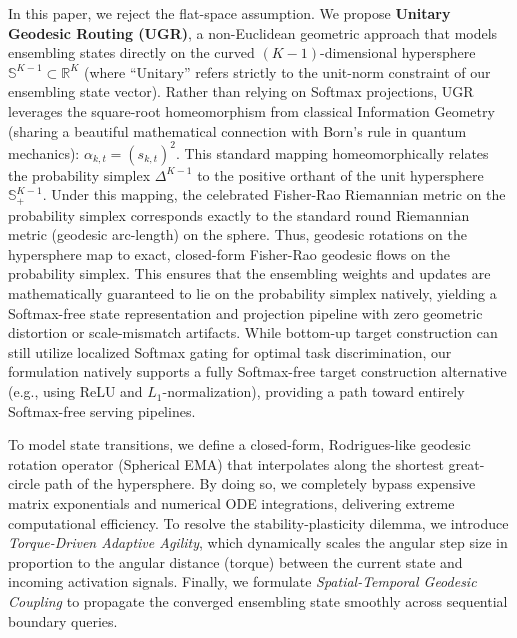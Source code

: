 In this paper, we reject the flat-space assumption. We propose \textbf{Unitary Geodesic Routing (UGR)}, a non-Euclidean geometric approach that models ensembling states directly on the curved $(K-1)$-dimensional hypersphere $\mathbb{S}^{K-1} \subset \mathbb{R}^K$ (where ``Unitary'' refers strictly to the unit-norm constraint of our ensembling state vector). Rather than relying on Softmax projections, UGR leverages the square-root homeomorphism from classical Information Geometry (sharing a beautiful mathematical connection with Born's rule in quantum mechanics): $\alpha_{k,t} = (s_{k,t})^2$. This standard mapping homeomorphically relates the probability simplex $\Delta^{K-1}$ to the positive orthant of the unit hypersphere $\mathbb{S}^{K-1}_+$. Under this mapping, the celebrated Fisher-Rao Riemannian metric on the probability simplex corresponds exactly to the standard round Riemannian metric (geodesic arc-length) on the sphere. Thus, geodesic rotations on the hypersphere map to exact, closed-form Fisher-Rao geodesic flows on the probability simplex. This ensures that the ensembling weights and updates are mathematically guaranteed to lie on the probability simplex natively, yielding a Softmax-free state representation and projection pipeline with zero geometric distortion or scale-mismatch artifacts. While bottom-up target construction can still utilize localized Softmax gating for optimal task discrimination, our formulation natively supports a fully Softmax-free target construction alternative (e.g., using ReLU and $L_1$-normalization), providing a path toward entirely Softmax-free serving pipelines.

To model state transitions, we define a closed-form, Rodrigues-like geodesic rotation operator (Spherical EMA) that interpolates along the shortest great-circle path of the hypersphere. By doing so, we completely bypass expensive matrix exponentials and numerical ODE integrations, delivering extreme computational efficiency. To resolve the stability-plasticity dilemma, we introduce \emph{Torque-Driven Adaptive Agility}, which dynamically scales the angular step size in proportion to the angular distance (torque) between the current state and incoming activation signals. Finally, we formulate \emph{Spatial-Temporal Geodesic Coupling} to propagate the converged ensembling state smoothly across sequential boundary queries.

